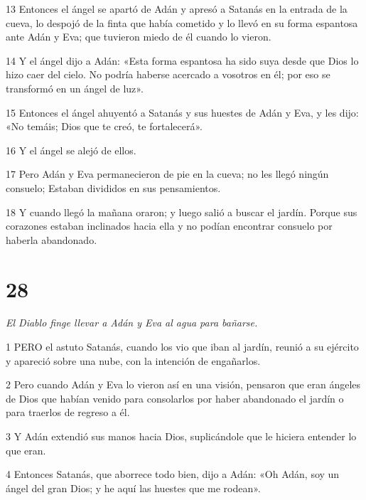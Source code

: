 \par 13 Entonces el ángel se apartó de Adán y apresó a Satanás en la entrada de la cueva, lo despojó de la finta que había cometido y lo llevó en su forma espantosa ante Adán y Eva; que tuvieron miedo de él cuando lo vieron.

\par 14 Y el ángel dijo a Adán: «Esta forma espantosa ha sido suya desde que Dios lo hizo caer del cielo. No podría haberse acercado a vosotros en él; por eso se transformó en un ángel de luz».

\par 15 Entonces el ángel ahuyentó a Satanás y sus huestes de Adán y Eva, y les dijo: «No temáis; Dios que te creó, te fortalecerá».

\par 16 Y el ángel se alejó de ellos.

\par 17 Pero Adán y Eva permanecieron de pie en la cueva; no les llegó ningún consuelo; Estaban divididos en sus pensamientos.

\par 18 Y cuando llegó la mañana oraron; y luego salió a buscar el jardín. Porque sus corazones estaban inclinados hacia ella y no podían encontrar consuelo por haberla abandonado.

\chapter{28}

\par \textit{El Diablo finge llevar a Adán y Eva al agua para bañarse.}

\par 1 PERO el astuto Satanás, cuando los vio que iban al jardín, reunió a su ejército y apareció sobre una nube, con la intención de engañarlos.

\par 2 Pero cuando Adán y Eva lo vieron así en una visión, pensaron que eran ángeles de Dios que habían venido para consolarlos por haber abandonado el jardín o para traerlos de regreso a él.

\par 3 Y Adán extendió sus manos hacia Dios, suplicándole que le hiciera entender lo que eran.

\par 4 Entonces Satanás, que aborrece todo bien, dijo a Adán: «Oh Adán, soy un ángel del gran Dios; y he aquí las huestes que me rodean».


